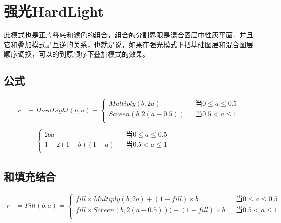%
%
%

\newpage
\section{ 强光HardLight}

此模式也是正片叠底和滤色的组合，组合的分割界限是混合图层中性灰平面，并且它和叠加模式是互逆的关系，也就是说，如果在强光模式下把基础图层和混合图层顺序调换，可以的到原顺序下叠加模式的效果。

\subsection{ 公式}

\begin{equation}
	\begin{aligned}r&= HardLight(b,a)=\left\{\begin{aligned}Multiply(b,2a)&&当 0\leq a \leq 0.5\\Screen(b,2(a-0.5))&&当 0.5< a \leq 1\\\end{aligned}\right.\\\\&=\left\{\begin{aligned}2ba&&当 0\leq a \leq 0.5\\1-2(1-b)(1-a)&&当 0.5< a \leq 1\\\end{aligned}\right.\end{aligned}
	\end{equation}

\subsection{ 和填充结合}

\begin{equation}
	\begin{aligned}r&= Fill(b,a)=\left\{\begin{aligned}fill\times Multiply(b,2a)+(1-fill)\times b&&当 0\leq a \leq 0.5\\fill\times Screen(b,2(a-0.5)))+(1-fill)\times b&&当 0.5< a \leq 1\\\end{aligned}\right.\end{aligned}
\end{equation}


